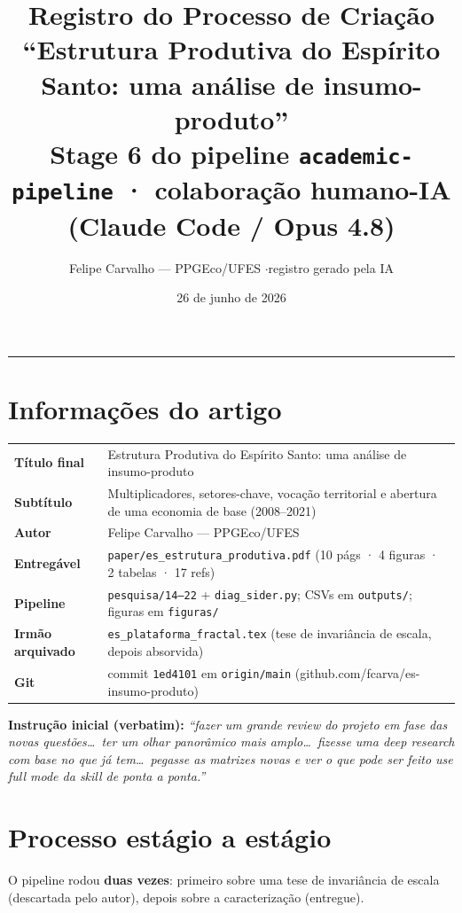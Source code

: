 \documentclass[12pt,a4paper]{article}
\title{\textbf{Registro do Processo de Criação}\\[4pt]
\large ``Estrutura Produtiva do Espírito Santo: uma análise de insumo-produto''\\[2pt]
\normalsize Stage 6 do pipeline \texttt{academic-pipeline} · colaboração humano-IA (Claude Code / Opus 4.8)}
\author{Felipe Carvalho — PPGEco/UFES \quad$\cdot$\quad registro gerado pela IA}
\date{26 de junho de 2026}
\begin{document}
\maketitle
\thispagestyle{fancy}
\tableofcontents
\bigskip\hrule\bigskip

\section{Informações do artigo}
\begin{longtable}{p{4.3cm}p{10cm}}
\toprule
\textbf{Título final} & Estrutura Produtiva do Espírito Santo: uma análise de insumo-produto \\
\textbf{Subtítulo} & Multiplicadores, setores-chave, vocação territorial e abertura de uma economia de base (2008--2021) \\
\textbf{Autor} & Felipe Carvalho — PPGEco/UFES \\
\textbf{Entregável} & \texttt{paper/es\_estrutura\_produtiva.pdf} (10 págs · 4 figuras · 2 tabelas · 17 refs) \\
\textbf{Pipeline} & \texttt{pesquisa/14--22} + \texttt{diag\_sider.py}; CSVs em \texttt{outputs/}; figuras em \texttt{figuras/} \\
\textbf{Irmão arquivado} & \texttt{es\_plataforma\_fractal.tex} (tese de invariância de escala, depois absorvida) \\
\textbf{Git} & commit \texttt{1ed4101} em \texttt{origin/main} (github.com/fcarva/es-insumo-produto) \\
\bottomrule
\end{longtable}

\noindent\textbf{Instrução inicial (verbatim):} \emph{``fazer um grande review do projeto em fase das
novas questões\dots\ ter um olhar panorâmico mais amplo\dots\ fizesse uma deep research com base no que
já tem\dots\ pegasse as matrizes novas e ver o que pode ser feito use full mode da skill de ponta a
ponta.''}

\section{Processo estágio a estágio}
O pipeline rodou \textbf{duas vezes}: primeiro sobre uma tese de invariância de escala (descartada pelo
autor), depois sobre a caracterização (entregue).
\end{document}
